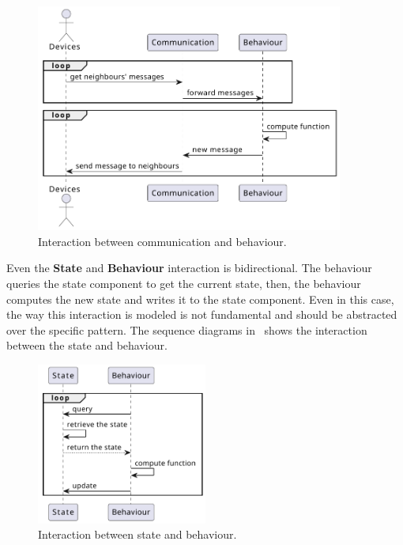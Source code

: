 \begin{figure}
	\centering
	\includegraphics[width=0.9\textwidth]{figures/sequence-diagram-comm.pdf}
	\caption{Interaction between communication and behaviour.}
	\label{fig:framework-components-interaction-2-communication-behaviour}
\end{figure}

Even the \textbf{State} and \textbf{Behaviour} interaction is bidirectional.
The behaviour queries the state component to get the current state, then, the behaviour computes the new state and writes it to the state component.
Even in this case, the way this interaction is modeled is not fundamental and should be abstracted over the specific pattern.
The sequence diagrams in~ shows the interaction between the state and behaviour.

\begin{figure}
	\centering
	\includegraphics[width=0.5\textwidth]{figures/sequence-diagram-state.pdf}
	\caption{Interaction between state and behaviour.}
	\label{fig:framework-components-interaction-2-state-behaviour}
\end{figure}

